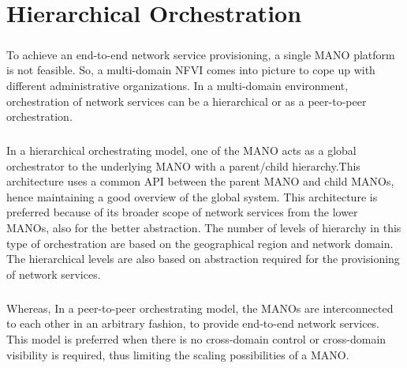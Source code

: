 \chapter{Hierarchical Orchestration}
\label{ch:Hierarchical Orchestration}

\paragraph{} To achieve an end-to-end network service provisioning, a single MANO platform is not feasible. So, a multi-domain NFVI comes into picture to cope up with different administrative organizations. In a multi-domain environment, orchestration of network services can be a hierarchical or as a peer-to-peer orchestration\cite{munoz2018hierarchical}.

\paragraph{} In a hierarchical orchestrating model, one of the MANO acts as a global orchestrator to the underlying MANO with a parent/child hierarchy.This architecture uses a common API between the parent MANO and child MANOs, hence maintaining a good overview of the global system. This architecture is preferred because of its broader scope of network services from the lower MANOs, also for the better abstraction. The number of levels of hierarchy in this type of orchestration are based on the geographical region and network domain. The hierarchical levels are also based on abstraction required for the provisioning of network services\cite{munoz2018hierarchical}.


\paragraph{}Whereas, In a peer-to-peer orchestrating model, the MANOs are interconnected to each other in an arbitrary fashion, to provide end-to-end network services. This model is preferred when there is no cross-domain control or cross-domain visibility is required, thus limiting the scaling possibilities of a MANO\cite{munoz2018hierarchical}.

 